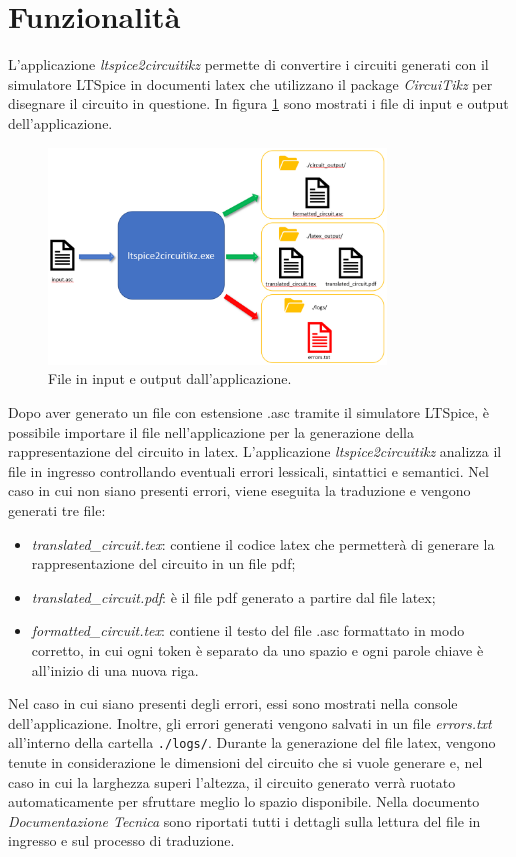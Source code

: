 \section{Funzionalità}
L'applicazione \textit{ltspice2circuitikz} permette di convertire i circuiti generati con il simulatore LTSpice in documenti latex che utilizzano il package \textit{CircuiTikz} per disegnare il circuito in questione. In figura \ref{fig:schema} sono mostrati i file di input e output dell'applicazione. 
\begin{figure}[h!]
	\centering
	\includegraphics[width=0.8\textwidth]{./ImageFiles/schema funzionamento.png}
	\caption{File in input e output dall'applicazione.}
	\label{fig:schema}
\end{figure}

\noindent
Dopo aver generato un file con estensione .asc tramite il simulatore LTSpice, è possibile importare il file nell'applicazione per la generazione della rappresentazione del circuito in latex. L'applicazione \textit{ltspice2circuitikz} analizza il file in ingresso controllando eventuali errori lessicali, sintattici  e semantici. Nel caso in cui non siano presenti errori, viene eseguita la traduzione e vengono generati tre file:
\begin{itemize}
	\item \textit{translated\_circuit.tex}: contiene il codice latex che permetterà di generare la rappresentazione del circuito in un file pdf;
	\item \textit{translated\_circuit.pdf}: è il file pdf generato a partire dal file latex; 
	\item \textit{formatted\_circuit.tex}: contiene il testo del file .asc formattato in modo corretto, in cui ogni token è separato da uno spazio e ogni parole chiave è all'inizio di una nuova riga.
\end{itemize}
Nel caso in cui siano presenti degli errori, essi sono mostrati nella console dell'applicazione. Inoltre, gli errori generati vengono salvati in un file \textit{errors.txt} all'interno della cartella \texttt{./logs/}.
Durante la generazione del file latex, vengono tenute in considerazione le dimensioni del circuito che si vuole generare e, nel caso in cui la larghezza superi l'altezza, il circuito generato verrà ruotato automaticamente per sfruttare meglio lo spazio disponibile. Nella documento \textit{Documentazione Tecnica} sono riportati tutti i dettagli sulla lettura del file in ingresso e sul processo di traduzione.


